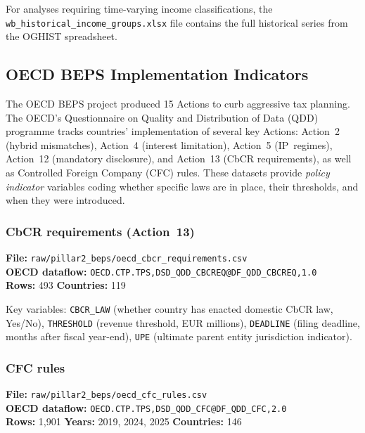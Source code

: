 \documentclass[11pt,a4paper]{article}
\newcommand{\code}[1]{\texttt{#1}}
\begin{document}
For analyses requiring time-varying income classifications, the \texttt{wb\_historical\_income\_groups.xlsx} file contains the full historical series from the OGHIST spreadsheet.


\subsection{OECD BEPS Implementation Indicators}\label{sec:beps}

The OECD BEPS project produced 15 Actions to curb aggressive tax planning. The OECD's Questionnaire on Quality and Distribution of Data (QDD) programme tracks countries' implementation of several key Actions: Action~2 (hybrid mismatches), Action~4 (interest limitation), Action~5 (IP~regimes), Action~12 (mandatory disclosure), and Action~13 (CbCR requirements), as well as Controlled Foreign Company (CFC) rules.  These datasets provide \emph{policy indicator} variables coding whether specific laws are in place, their thresholds, and when they were introduced.

\subsubsection{CbCR requirements (Action~13)}

\textbf{File:} \texttt{raw/pillar2\_beps/oecd\_cbcr\_requirements.csv}\\
\textbf{OECD dataflow:} \texttt{OECD.CTP.TPS,DSD\_QDD\_CBCREQ@DF\_QDD\_CBCREQ,1.0}\\
\textbf{Rows:} 493 \quad \textbf{Countries:} 119

Key variables: \code{CBCR\_LAW} (whether country has enacted domestic CbCR law, Yes/No), \code{THRESHOLD} (revenue threshold, EUR millions), \code{DEADLINE} (filing deadline, months after fiscal year-end), \code{UPE} (ultimate parent entity jurisdiction indicator).

\subsubsection{CFC rules}

\textbf{File:} \texttt{raw/pillar2\_beps/oecd\_cfc\_rules.csv}\\
\textbf{OECD dataflow:} \texttt{OECD.CTP.TPS,DSD\_QDD\_CFC@DF\_QDD\_CFC,2.0}\\
\textbf{Rows:} 1{,}901 \quad \textbf{Years:} 2019, 2024, 2025 \quad \textbf{Countries:} 146
\end{document}
